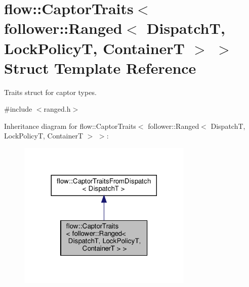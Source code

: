 \hypertarget{structflow_1_1_captor_traits_3_01follower_1_1_ranged_3_01_dispatch_t_00_01_lock_policy_t_00_01_container_t_01_4_01_4}{}\section{flow\+:\+:Captor\+Traits$<$ follower\+:\+:Ranged$<$ DispatchT, Lock\+PolicyT, ContainerT $>$ $>$ Struct Template Reference}
\label{structflow_1_1_captor_traits_3_01follower_1_1_ranged_3_01_dispatch_t_00_01_lock_policy_t_00_01_container_t_01_4_01_4}


Traits struct for captor types.  




{\ttfamily \#include $<$ranged.\+h$>$}



Inheritance diagram for flow\+:\+:Captor\+Traits$<$ follower\+:\+:Ranged$<$ DispatchT, Lock\+PolicyT, ContainerT $>$ $>$\+:\nopagebreak
\begin{figure}[H]
\begin{center}
\leavevmode
\includegraphics[width=236pt]{structflow_1_1_captor_traits_3_01follower_1_1_ranged_3_01_dispatch_t_00_01_lock_policy_t_00_01_c617262bd8da7c1e39d912081ad438020}
\end{center}
\end{figure}


